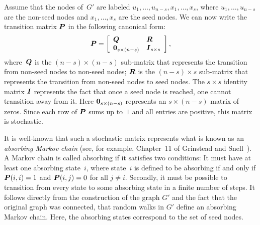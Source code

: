 Assume that the nodes of~$G'$ are labeled $u_1, \ldots, u_{n - s}, x_{1}, \ldots, x_{s}$, 
where $u_1, \ldots, u_{n - s}$ are the non-seed nodes and $x_1, \ldots, x_s$ are the seed nodes. 
We can now write the transition matrix $\boldsymbol{P}$ in the following canonical form:
\begin{equation}\label{eqn:canonical_form_P}
	\boldsymbol{P} = 	\left [ \begin{array}{ll}
						\boldsymbol{Q}  & \boldsymbol{R} \\
						 \boldsymbol{0}_{s \times (n - s)} & \boldsymbol{I}_{s \times s}
						\end{array}
				\right ],
\end{equation}
where~$\boldsymbol{Q}$ is the $(n - s) \times (n - s)$ sub-matrix that represents the transition 
from non-seed nodes to non-seed nodes; $\boldsymbol{R}$ is the $(n - s) \times s$ sub-matrix 
that represents the transition from non-seed nodes to seed nodes. The $s \times s$ identity 
matrix $\boldsymbol{I}$ represents the fact that once a seed node is reached, one cannot transition away 
from it. Here $\boldsymbol{0}_{s \times (n - s)}$ represents an $s \times (n - s)$ matrix of zeros. 
Since each row of $\boldsymbol{P}$ sums up to~$1$ and all entries are positive, this matrix is stochastic.

It is well-known that such a stochastic matrix represents what is known as an 
\emph{absorbing Markov chain} (see, for example, Chapter~11 of Grinstead and Snell~\cite{GS98}).  
A Markov chain is called absorbing if it satisfies two conditions: 
It must have at least one absorbing state~$i$, where state~$i$ is defined 
to be absorbing if and only if $\boldsymbol{P}(i,i) = 1$ and $\boldsymbol{P}(i, j) = 0$ 
for all $j \neq i$. Secondly, it must be possible to transition from every state to 
some absorbing state in a finite number of steps.
It follows directly from the construction of the graph $G'$ and the fact that the 
original graph was connected, that random walks in $G'$ define an absorbing Markov chain. 
Here, the absorbing states correspond to the set of seed nodes.


